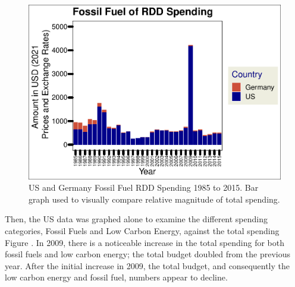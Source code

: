 \documentclass[
  12pt,
]{article}
\begin{document}
\begin{figure}
\centering
\includegraphics{Chang_Jenkins_Mullens_ENV872_Final_files/figure-latex/US and Germ fossil fuel Bar-1.pdf}
\caption{US and Germany Fossil Fuel RDD Spending 1985 to 2015. Bar graph
used to visually compare relative magnitude of total spending.}
\end{figure}

Then, the US data was graphed alone to examine the different spending
categories, Fossil Fuels and Low Carbon Energy, against the total
spending Figure . In 2009, there is a noticeable increase in the total
spending for both fossil fuels and low carbon energy; the total budget
doubled from the previous year. After the initial increase in 2009, the
total budget, and consequently the low carbon energy and fossil fuel,
numbers appear to decline.
\end{document}
